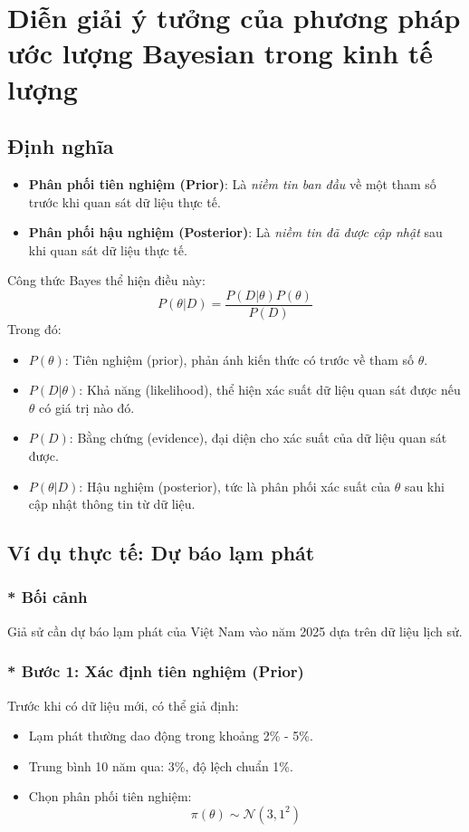 \section{Diễn giải ý tưởng của phương pháp ước lượng Bayesian trong kinh tế lượng}

\subsection{Định nghĩa}
\begin{itemize}
    \item \textbf{Phân phối tiên nghiệm (Prior)}: Là \textit{niềm tin ban đầu} về một tham số trước khi quan sát dữ liệu thực tế.
    \item \textbf{Phân phối hậu nghiệm (Posterior)}: Là \textit{niềm tin đã được cập nhật} sau khi quan sát dữ liệu thực tế.
\end{itemize}

Công thức Bayes thể hiện điều này:
\begin{equation}
    P(\theta | D) = \frac{P(D | \theta) P(\theta)}{P(D)}
\end{equation}
Trong đó:
\begin{itemize}
    \item $P(\theta)$: Tiên nghiệm (prior), phản ánh kiến thức có trước về tham số $\theta$.
    \item $P(D | \theta)$: Khả năng (likelihood), thể hiện xác suất dữ liệu quan sát được nếu $\theta$ có giá trị nào đó.
    \item $P(D)$: Bằng chứng (evidence), đại diện cho xác suất của dữ liệu quan sát được.
    \item $P(\theta | D)$: Hậu nghiệm (posterior), tức là phân phối xác suất của $\theta$ sau khi cập nhật thông tin từ dữ liệu.
\end{itemize}

\subsection{Ví dụ thực tế: Dự báo lạm phát}

\subsubsection{* Bối cảnh}
Giả sử cần dự báo lạm phát của Việt Nam vào năm 2025 dựa trên dữ liệu lịch sử.

\subsubsection{* Bước 1: Xác định tiên nghiệm (Prior)}
Trước khi có dữ liệu mới, có thể giả định:
\begin{itemize}
    \item Lạm phát thường dao động trong khoảng 2\% - 5\%.
    \item Trung bình 10 năm qua: 3\%, độ lệch chuẩn 1\%.
    \item Chọn phân phối tiên nghiệm: 
    \begin{equation}
        \pi(\theta) \sim \mathcal{N}(3, 1^2)
    \end{equation}
\end{itemize}

